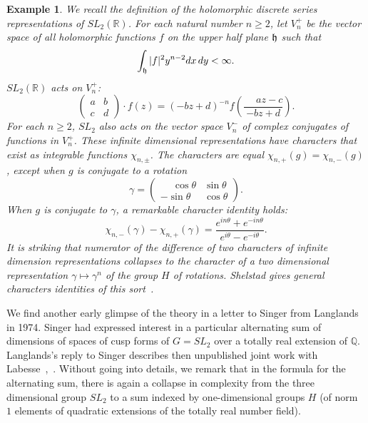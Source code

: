 \documentclass[brochure,english,12pt]{bourbaki}
\newtheorem{example}[equation]{Example}
\newcommand{\ring}[1]{\mathbb{#1}}
\begin{document}
\begin{example}\label{ex:sl2}  We recall the definition of the holomorphic discrete series representations
of $SL_2(\ring{R})$.  For each natural number $n\ge 2$, let $V^+_n$ be the vector space
of all holomorphic functions $f$ on the upper half plane ${\frak h}$ such that
\[
\int_{\frak h} |f|^2 y^{n-2} dx\, dy < \infty.
\]
$SL_2(\ring{R})$ acts on $V^+_n$:
\[
\begin{pmatrix} a & b \\ c & d \end{pmatrix} \cdot f(z) = 
(-b z + d ) ^{-n} f (\frac{\phantom{-}a z - c}{-b z + d}).
\]
For each $n\ge 2$, $SL_2$ also acts on the vector space $V^-_n$ of
complex conjugates of functions in $V^+_n$.  These infinite
dimensional representations have characters that exist as integrable
functions $\chi_{n,\pm}$.  The characters are equal
$\chi_{n,+}(g)=\chi_{n,-}(g)$, except when $g$ is conjugate to a
rotation
\[
\gamma = \begin{pmatrix} \phantom{-}\cos\theta & \sin\theta \\ -\sin\theta & \cos\theta\end{pmatrix}.
\] 
When $g$ is conjugate to $\gamma$, a remarkable character identity holds:
\[
\chi_{n,-}(\gamma) - \chi_{n,+}(\gamma) = 
\frac{e^{i n \theta} + e^{- i n \theta}}{e^{i\theta}-e^{-i\theta}}.
\]
It is striking that numerator of the difference of two characters of
infinite dimension representations collapses to the character of a two
dimensional representation $\gamma\mapsto \gamma^n$ of the group $H$ of
rotations.  Shelstad gives general characters identities of this
sort~\cite{XX}. %
\end{example}

We find another early glimpse of the theory in a letter to Singer from
Langlands in 1974.  Singer had expressed interest  in a
particular alternating sum of dimensions of spaces of cusp forms of
$G=SL_2$ over a totally real extension of $\ring{Q}$. 
Langlands's reply to Singer describes then unpublished
joint work with Labesse~\cite{L:singer:1974},~\cite{LL:1979}.  Without
going into details, we remark
that in the formula for the
  alternating sum, there is again a collapse in complexity from the
  three dimensional group $SL_2$ to a sum indexed by one-dimensional
  groups $H$ (of norm $1$ elements of quadratic extensions of the totally real number field).
\end{document}
